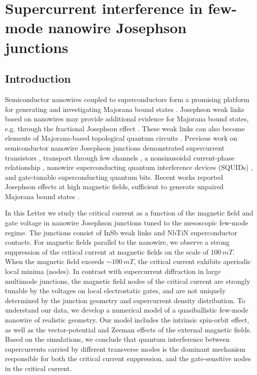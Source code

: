 \chapter{Supercurrent interference in few-mode nanowire Josephson junctions}
\label{ch:supercurrent}

\newpage
\noindent 
\section{Introduction}

Semiconductor nanowires coupled to superconductors form a promising platform for generating and investigating Majorana bound states \cite{kitaev2001unpaired, oreg2010helical, lutchyn2010majorana,mourik2012signatures, deng2016majorana, albrecht2016exponential,chen2016phasediagram}. 
Josephson weak links based on nanowires may provide additional evidence for Majorana bound states, e.g. through the fractional Josephson effect \cite{molenkamp2016abs4pi,bocquillon2016gapless,Deacon2016josephsonradiation}. 
These weak links can also become elements of Majorana-based topological quantum circuits \cite{Hyart2013braiding, Aasen2016briading, Karzig2016braiding, plugge2016majorana}.
Previous work on semiconductor nanowire Josephson junctions demonstrated supercurrent transistors \cite{doh2005tunable}, transport through few channels \cite{goffman2017conduction}, a nonsinusoidal current-phase relationship \cite{spanton2017current}, nanowire superconducting quantum interference devices (SQUIDs) \cite{vanDam2006supercurrent, szombati2015josephson}, and gate-tunable superconducting quantum bits\cite{deLange2015hyrbidnanowire,marcus2015hyrbidnanowire}.
Recent works reported Josephson effects at high magnetic fields, sufficient to generate unpaired Majorana bound states \cite{szombati2015josephson,giazaotto2015pbinas,giazotto2016magnetically,gharavi2016nb}.

In this Letter we study the critical current as a function of the magnetic field and gate voltage in nanowire Josephson junctions tuned to the mesoscopic few-mode regime.
The junctions consist of InSb weak links and NbTiN superconductor contacts.
For magnetic fields parallel to the nanowire, we observe a strong suppression of the critical current at magnetic fields on the scale of $\SI{100}{mT}$. 
When the magnetic field exceeds $\sim \SI{100}{mT}$, the critical current exhibits aperiodic local minima (nodes). 
In contrast with supercurrent diffraction in large multimode junctions, the magnetic field nodes of the critical current are strongly tunable by the voltages on local electrostatic gates, and are not uniquely determined by the junction geometry and supercurrent density distribution. 
To understand our data, we develop a numerical model of a quasiballistic few-mode nanowire of realistic geometry.
Our model includes the intrinsic spin-orbit effect, as well as the vector-potential and Zeeman effects of the external magnetic fields. 
Based on the simulations, we conclude that quantum interference between supercurrents carried by different transverse modes is the dominant mechanism responsible for both the critical current suppression, and the gate-sensitive nodes in the critical current.

